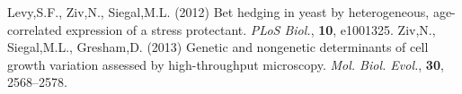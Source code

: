 \documentclass[a4paper]{article}
\begin{document}
\begin{thebibliography}{}
 Levy,S.F., Ziv,N., Siegal,M.L. (2012) Bet hedging in yeast by heterogeneous, age-correlated expression of a stress protectant. {\it PLoS Biol.}, {\bf 10}, e1001325.
Ziv,N., Siegal,M.L., Gresham,D. (2013) Genetic and nongenetic determinants of cell growth variation assessed by high-throughput microscopy. {\it Mol. Biol. Evol.}, {\bf 30}, 2568–2578. 

\end{thebibliography}{}
\end{document}
